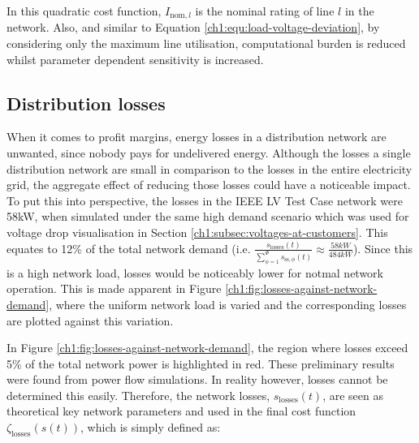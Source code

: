 

In this quadratic cost function, $I_{\text{nom},l}$ is the nominal rating of line $l$ in the network.
Also, and similar to Equation \ref{ch1:equ:load-voltage-deviation}, by considering only the maximum line utilisation, computational burden is reduced whilst parameter dependent sensitivity is increased.

\subsection{Distribution losses}
\label{ch1:subsec:losses}

When it comes to profit margins, energy losses in a distribution network are unwanted, since nobody pays for undelivered energy.
Although the losses a single distribution network are small in comparison to the losses in the entire electricity grid, the aggregate effect of reducing those losses could have a noticeable impact.
To put this into perspective, the losses in the IEEE LV Test Case network were 58kW, when simulated under the same high demand scenario which was used for voltage drop visualisation in Section \ref{ch1:subsec:voltages-at-customers}.
This equates to 12\% of the total network demand ($\text{i.e. }\frac{s_\text{losses}(t)}{\sum_{\phi=1}^\Phi{s_{\text{ss},\phi}(t)}} \approx \frac{58kW}{484kW}$).
Since this is a high network load, losses would be noticeably lower for notmal network operation.
This is made apparent in Figure \ref{ch1:fig:losses-against-network-demand}, where the uniform network load is varied and the corresponding losses are plotted against this variation.




In Figure \ref{ch1:fig:losses-against-network-demand}, the region where losses exceed 5\% of the total network power is highlighted in red.
These preliminary results were found from power flow simulations.
In reality however, losses cannot be determined this easily.
Therefore, the network losses, $s_\text{losses}(t)$, are seen as theoretical key network parameters and used in the final cost function $\zeta_\text{losses}(s(t))$, which is simply defined as:



